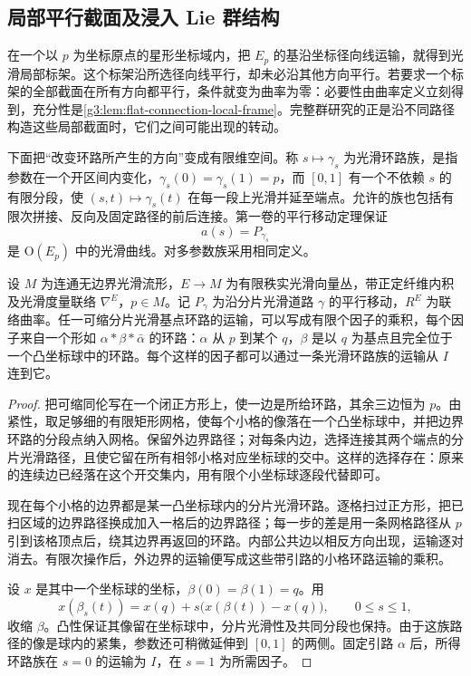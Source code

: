 \subsection{局部平行截面及浸入 Lie 群结构}
\label{g3:subsec:0501:03}

在一个以 \(p\) 为坐标原点的星形坐标域内，把 \(E_p\) 的基沿坐标径向线运输，就得到光滑局部标架。这个标架沿所选径向线平行，却未必沿其他方向平行。若要求一个标架的全部截面在所有方向都平行，条件就变为曲率为零：必要性由曲率定义立刻得到，充分性是\cref{g3:lem:flat-connection-local-frame}。完整群研究的正是沿不同路径构造这些局部截面时，它们之间可能出现的转动。

\ProseParagraphBreak

下面把“改变环路所产生的方向”变成有限维空间。称 \(s\mapsto\gamma_s\) 为光滑环路族，是指参数在一个开区间内变化，\(\gamma_s(0)=\gamma_s(1)=p\)，而 \([0,1]\) 有一个不依赖 \(s\) 的有限分段，使 \((s,t)\mapsto\gamma_s(t)\) 在每一段上光滑并延至端点。允许的族也包括有限次拼接、反向及固定路径的前后连接。第一卷的平行移动定理保证
\[
	a(s)=P_{\gamma_s}
\]
是 \(\mathrm O(E_p)\) 中的光滑曲线。对多参数族采用相同定义。

\begin{lemma}\label{g3:lem:contractible-loop-generators}
	设 \(M\) 为连通无边界光滑流形，\(E\to M\) 为有限秩实光滑向量丛，带正定纤维内积及光滑度量联络 \(\nabla^E\)，\(p\in M\)。记 \(P_\gamma\) 为沿分片光滑道路 \(\gamma\) 的平行移动，\(R^E\) 为联络曲率。任一可缩分片光滑基点环路的运输，可以写成有限个因子的乘积，每个因子来自一个形如 \(\alpha*\beta*\bar\alpha\) 的环路：\(\alpha\) 从 \(p\) 到某个 \(q\)，\(\beta\) 是以 \(q\) 为基点且完全位于一个凸坐标球中的环路。每个这样的因子都可以通过一条光滑环路族的运输从 \(I\) 连到它。
\end{lemma}
\begin{proof}
	把可缩同伦写在一个闭正方形上，使一边是所给环路，其余三边恒为 \(p\)。由紧性，取足够细的有限矩形网格，使每个小格的像落在一个凸坐标球中，并把边界环路的分段点纳入网格。保留外边界路径；对每条内边，选择连接其两个端点的分片光滑路径，且使它留在所有相邻小格对应坐标球的交中。这样的选择存在：原来的连续边已经落在这个开交集内，用有限个小坐标球逐段代替即可。

	现在每个小格的边界都是某一凸坐标球内的分片光滑环路。逐格扫过正方形，把已扫区域的边界路径换成加入一格后的边界路径；每一步的差是用一条网格路径从 \(p\) 引到该格顶点后，绕其边界再返回的环路。内部公共边以相反方向出现，运输逐对消去。有限次操作后，外边界的运输便写成这些带引路的小格环路运输的乘积。

	设 \(x\) 是其中一个坐标球的坐标，\(\beta(0)=\beta(1)=q\)。用
	\[
		x(\beta_s(t))=x(q)+s\bigl(x(\beta(t))-x(q)\bigr),\qquad0\leq s\leq1,
	\]
	收缩 \(\beta\)。凸性保证其像留在坐标球中，分片光滑性及共同分段也保持。由于这族路径的像是球内的紧集，参数还可稍微延伸到 \([0,1]\) 的两侧。固定引路 \(\alpha\) 后，所得环路族在 \(s=0\) 的运输为 \(I\)，在 \(s=1\) 为所需因子。
\end{proof}

